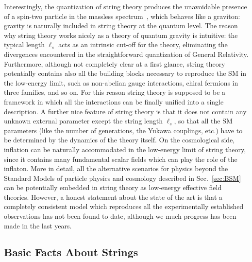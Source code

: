 \documentclass[12pt,a4paper]{book}
\begin{document}
Interestingly, the quantization of string theory produces the unavoidable presence of a spin-two particle in the massless spectrum~\cite{Scherk:1974ca}, which behaves like a graviton: gravity is naturally included in string theory at the quantum level. The reason why string theory works nicely as a theory of quantum gravity is intuitive: the typical length $\ell_s$ acts as an intrinsic cut-off for the theory, eliminating the divergences encountered in the straightforward quantization of General Relativity. Furthermore, although not completely clear at a first glance, string theory potentially contains also all the building blocks necessary to reproduce the SM in the low-energy limit, such as non-abelian gauge interactions, chiral fermions in three families, and so on. For this reason string theory is supposed to be a framework in which all the interactions can be finally unified into a single description. A further nice feature of string theory is that it does not contain any unknown external parameter except the string length $\ell_s$, so that all the SM parameters (like the number of generations, the Yukawa couplings, etc.) have to be determined by the dynamics of the theory itself. On the cosmological side, inflation can be naturally accommodated in the low-energy limit of string theory, since it contains many fundamental scalar fields which can play the role of the inflaton. More in detail, all the alternative scenarios for physics beyond the Standard Models of particle physics and cosmology described in Sec.~\ref{sec:BSM} can be potentially embedded in string theory as low-energy effective field theories. However, a honest statement about the state of the art is that a completely consistent model which reproduces all the experimentally established observations has not been found to date, although we much progress has been made in the last years.

\subsection{Basic Facts About Strings}
\label{ssec:BasicsOfStrings}
\end{document}
